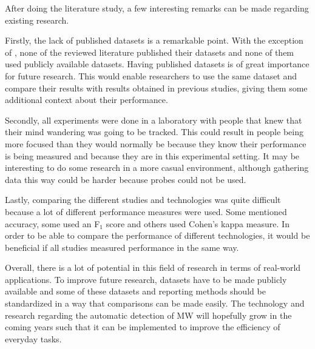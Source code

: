 After doing the literature study, a few interesting remarks can be made regarding existing research.

Firstly, the lack of published datasets is a remarkable point. With the exception of \cite{Zhao2017ScalableApproach}, none of the reviewed literature published their datasets and none of them used publicly available datasets. Having published datasets is of great importance for future research. This would enable researchers to use the same dataset and compare their results with results obtained in previous studies, giving them some additional context about their performance.

Secondly, all experiments were done in a laboratory with people that knew that their mind wandering was going to be tracked. This could result in people being more focused than they would normally be because they know their performance is being measured and because they are in this experimental setting. It may be interesting to do some research in a more casual environment, although gathering data this way could be harder because probes could not be used.

Lastly, comparing the different studies and technologies was quite difficult because a lot of different performance measures were used. Some mentioned accuracy, some used an F$_1$ score and others used Cohen's kappa measure. In order to be able to compare the performance of different technologies, it would be beneficial if all studies measured performance in the same way.  

Overall, there is a lot of potential in this field of research in terms of real-world applications. To improve future research, datasets have to be made publicly available and some of these datasets and reporting methods should be standardized in a way that comparisons can be made easily. The technology and research regarding the automatic detection of MW will hopefully grow in the coming years such that it can be implemented to improve the efficiency of everyday tasks.